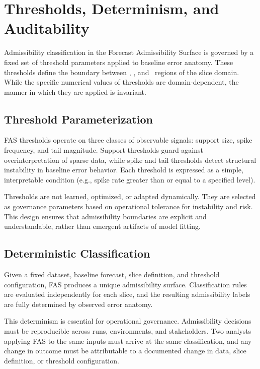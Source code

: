 
\section{Thresholds, Determinism, and Auditability}
\label{sec:fas_thresholds_auditability}

Admissibility classification in the Forecast Admissibility Surface is governed by
a fixed set of threshold parameters applied to baseline error anatomy. These
thresholds define the boundary between \Allowed, \Conditional, and \Blocked\
regions of the slice domain. While the specific numerical values of thresholds
are domain-dependent, the manner in which they are applied is invariant.

\subsection{Threshold Parameterization}

FAS thresholds operate on three classes of observable signals: support size,
spike frequency, and tail magnitude. Support thresholds guard against
overinterpretation of sparse data, while spike and tail thresholds detect
structural instability in baseline error behavior. Each threshold is expressed
as a simple, interpretable condition (e.g., spike rate greater than or equal to a
specified level).

Thresholds are not learned, optimized, or adapted dynamically. They are selected
as governance parameters based on operational tolerance for instability and
risk. This design ensures that admissibility boundaries are explicit and
understandable, rather than emergent artifacts of model fitting.

\subsection{Deterministic Classification}

Given a fixed dataset, baseline forecast, slice definition, and threshold
configuration, FAS produces a unique admissibility surface. Classification rules
are evaluated independently for each slice, and the resulting admissibility
labels are fully determined by observed error anatomy.

This determinism is essential for operational governance. Admissibility decisions
must be reproducible across runs, environments, and stakeholders. Two analysts
applying FAS to the same inputs must arrive at the same classification, and any
change in outcome must be attributable to a documented change in data, slice
definition, or threshold configuration.


